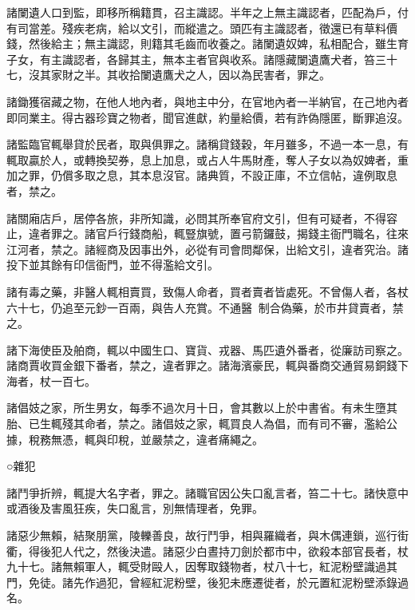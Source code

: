 \begin{pinyinscope}
 諸闌遺人口到監，即移所稱籍貫，召主識認。半年之上無主識認者，匹配為戶，付有司當差。殘疾老病，給以文引，而縱遣之。頭匹有主識認者，徵還已有草料價錢，然後給主；無主識認，則籍其毛齒而收養之。諸闌遺奴婢，私相配合，雖生育子女，有主識認者，各歸其主，無本主者官與收系。諸隱藏闌遺鷹犬者，笞三十七，沒其家財之半。其收拾闌遺鷹犬之人，因以為民害者，罪之。



 諸鋤獲宿藏之物，在他人地內者，與地主中分，在官地內者一半納官，在己地內者即同業主。得古器珍寶之物者，聞官進獻，約量給價，若有詐偽隱匿，斷罪追沒。



 諸監臨官輒舉貸於民者，取與俱罪之。諸稱貸錢穀，年月雖多，不過一本一息，有輒取贏於人，或轉換契券，息上加息，或占人牛馬財產，奪人子女以為奴婢者，重加之罪，仍償多取之息，其本息沒官。諸典質，不設正庫，不立信帖，違例取息者，禁之。



 諸關廂店戶，居停各旅，非所知識，必問其所奉官府文引，但有可疑者，不得容止，違者罪之。諸官戶行錢商船，輒豎旗號，置弓箭鑼鼓，揭錢主衙門職名，往來江河者，禁之。諸經商及因事出外，必從有司會問鄰保，出給文引，違者究治。諸投下並其餘有印信衙門，並不得濫給文引。



 諸有毒之藥，非醫人輒相賣買，致傷人命者，買者賣者皆處死。不曾傷人者，各杖六十七，仍追至元鈔一百兩，與告人充賞。不通醫，制合偽藥，於市井貸賣者，禁之。



 諸下海使臣及舶商，輒以中國生口、寶貨、戎器、馬匹遺外番者，從廉訪司察之。諸商賈收買金銀下番者，禁之，違者罪之。諸海濱豪民，輒與番商交通貿易銅錢下海者，杖一百七。



 諸倡妓之家，所生男女，每季不過次月十日，會其數以上於中書省。有未生墮其胎、已生輒殘其命者，禁之。諸倡妓之家，輒買良人為倡，而有司不審，濫給公據，稅務無憑，輒與印稅，並嚴禁之，違者痛繩之。



 ○雜犯



 諸鬥爭折辨，輒提大名字者，罪之。諸職官因公失口亂言者，笞二十七。諸快意中或酒後及害風狂疾，失口亂言，別無情理者，免罪。



 諸惡少無賴，結聚朋黨，陵轢善良，故行鬥爭，相與羅織者，與木偶連鎖，巡行街衢，得後犯人代之，然後決遣。諸惡少白晝持刀劍於都市中，欲殺本部官長者，杖九十七。諸無賴軍人，輒受財毆人，因奪取錢物者，杖八十七，紅泥粉壁識過其門，免徒。諸先作過犯，曾經紅泥粉壁，後犯未應遷徙者，於元置紅泥粉壁添錄過名。




\end{pinyinscope}

